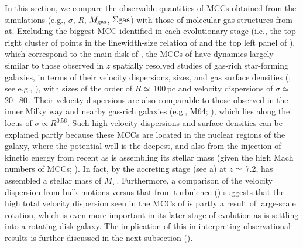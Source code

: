 \IfFileExists{emulateapjlegacy.cls}{\documentclass[iop]{emulateapjlegacy}}{\documentclass[iop]{emulateapj}}
\begin{document}
In this section, we compare the observable quantities of MCCs obtained from the simulations (e.g., $\sigma$, $R$, $M_{\rm gas}$,
$\Sigma{\rm gas}$) with those of molecular gas structures from \obs at.
Excluding the biggest MCC identified in each evolutionary stage (i.e., the top right cluster of points in the
linewidth-size relation of  and the top left panel of ), which correspond to
the main disk of \flower, the MCCs of \flower have dynamics largely similar to those observed in
$z$ spatially resolved studies of gas-rich star-forming
galaxies, in terms of their velocity dispersions, sizes, and gas
surface densities (; see e.g.,
\citealt{Swinbank11a}), with sizes of the order of $R\simeq$\,100\,pc
and velocity dispersions of $\sigma\simeq$\,20$-$80\,\kms.
Their velocity dispersions are also comparable to those observed in the inner
Milky way and nearby gas-rich galaxies (e.g., M64; \citealt{Oka01a, Rosolowsky05a, Heyer09a}), which lies along the
locus of $\sigma\propto R^{0.56}$.
Such high velocity dispersions and surface densities can be explained partly because
these MCCs are located in the nuclear regions of the galaxy, where the potential well is the deepest,
and also from the injection of kinetic energy from recent
\SF as \flower is assembling its stellar mass (given the high Mach numbers of MCCs; ).
In fact, by the accreting stage (see a) at $z\simeq$\,7.2,
\flower has assembled a stellar mass of
$M_\star$\,\Msun.
Furthermore, a comparison of the velocity dispersion from bulk motions versus that from turbulence () suggests that
the high total velocity dispersion seen in the MCCs of \flower is partly a result of large-scale rotation, which is even more important in
its later stage of evolution as \flower is settling into a rotating disk galaxy. The implication of this in
interpreting observational results is further discussed in the next subsection ().
\end{document}
